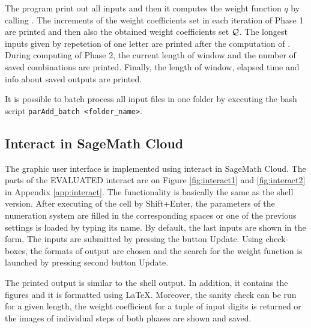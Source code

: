 The program print out all inputs and then it computes the weight function $q$ by calling . The increments of the weight coefficients set in each iteration of Phase 1 are printed and then also the obtained weight coefficients set $\mathcal{Q}$. The longest inputs given by repetetion of one letter are printed after the computation of . During computing of Phase 2, the current length of window and the number of saved combinations are printed. Finally, the length of window, elapsed time and info about saved outputs are printed.  

It is possible to batch process all input files in one folder by executing the bash script \verb+parAdd_batch <folder_name>+.  

\subsection{Interact in SageMath Cloud}
The graphic user interface is implemented using interact in SageMath Cloud. The parts of the EVALUATED interact are on Figure \ref{fig:interact1} and \ref{fig:interact2} in Appendix \ref{app:interact}. The functionality is basically the same as the shell version. After executing of the cell by Shift+Enter, the parameters of the numeration system are filled in the corresponding spaces or one of the previous settings is loaded by typing its name.  By default, the last inputs are shown in the form. The inputs are submitted by pressing the button Update. Using check-boxes, the formats of output are chosen and the search for the weight function is launched by pressing second button Update.

The printed output is similar to the shell output. In addition, it contains the figures and it is formatted using \LaTeX. Moreover, the sanity check can be run for a given length, the weight coefficient for a tuple of  input digits is returned or the images of individual steps of both phases are shown and saved.